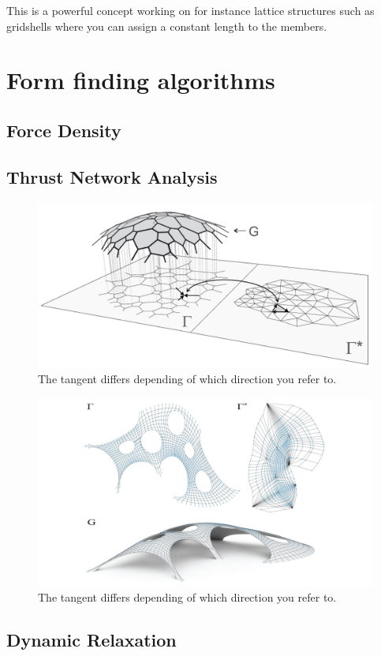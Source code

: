 This is a powerful concept working on for instance lattice structures such as gridshells where you can assign a constant length to the members.


\section{Form finding algorithms}

\subsection{Force Density}

\subsection{Thrust Network Analysis}

\begin{figure}[H]
\centering
\includegraphics[width=0.6\linewidth ]{figure/Theory/TNA.jpg}
\caption{The tangent differs depending of which direction you refer to. }
\end{figure}

\begin{figure}[H]
\centering
\includegraphics[width=0.6\linewidth ]{figure/Theory/RhinoVault.jpg}
\caption{The tangent differs depending of which direction you refer to. }
\end{figure}

\subsection{Dynamic Relaxation}

